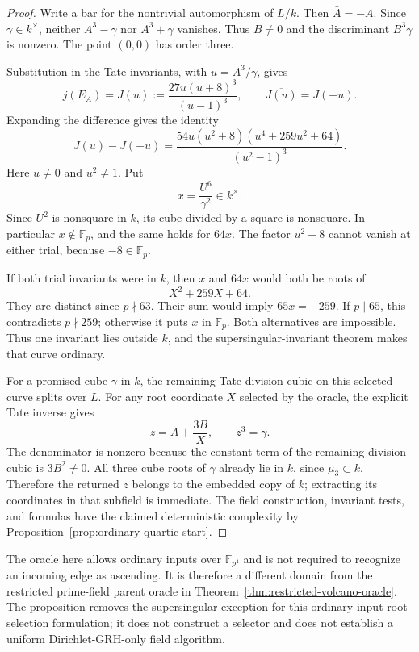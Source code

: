 \documentclass[11pt]{article}
\theoremstyle{definition}
\theoremstyle{remark}
\begin{document}
\begin{proof}
Write a bar for the nontrivial automorphism of $L/k$.
Then $\bar A=-A$.  Since $\gamma\in k^\times$, neither
$A^3-\gamma$ nor $A^3+\gamma$ vanishes.  Thus $B\ne0$ and
the discriminant $B^3\gamma$ is nonzero.  The point $(0,0)$
has order three.

Substitution in the Tate invariants, with $u=A^3/\gamma$,
gives
\[
 j(E_A)=J(u):=\frac{27u(u+8)^3}{(u-1)^3},
 \qquad \overline{J(u)}=J(-u).
\]
Expanding the difference gives the identity
\[
 J(u)-J(-u)
 =\frac{54u(u^2+8)(u^4+259u^2+64)}{(u^2-1)^3}.
\]
Here $u\ne0$ and $u^2\ne1$.  Put
\[
 x=\frac{U^6}{\gamma^2}\in k^\times.
\]
Since $U^2$ is nonsquare in $k$, its cube divided by a square
is nonsquare.  In particular $x\notin\mathbb F_p$, and the
same holds for $64x$.  The factor $u^2+8$ cannot vanish at
either trial, because $-8\in\mathbb F_p$.

If both trial invariants were in $k$, then $x$ and $64x$ would
both be roots of
\[
 X^2+259X+64.
\]
They are distinct since $p\nmid63$.  Their sum would imply
$65x=-259$.  If $p\mid65$, this contradicts $p\nmid259$;
otherwise it puts $x$ in $\mathbb F_p$.  Both alternatives
are impossible.  Thus one invariant lies outside $k$, and
the supersingular-invariant theorem makes that curve ordinary.

For a promised cube $\gamma$ in $k$, the remaining Tate
division cubic on this selected curve splits over $L$.
For any root coordinate $X$ selected by the oracle, the
explicit Tate inverse gives
\[
 z=A+\frac{3B}{X},\qquad z^3=\gamma.
\]
The denominator is nonzero because the constant term of the
remaining division cubic is $3B^2\ne0$.  All three cube
roots of $\gamma$ already lie in $k$, since $\mu_3\subset k$.
Therefore the returned $z$ belongs to the embedded copy of $k$;
extracting its coordinates in that subfield is immediate.
The field construction, invariant tests, and formulas have the
claimed deterministic complexity by
Proposition~\ref{prop:ordinary-quartic-start}.
\end{proof}

The oracle here allows ordinary inputs over $\mathbb F_{p^4}$
and is not required to recognize an incoming edge as ascending.
It is therefore a different domain from the restricted prime-field
parent oracle in Theorem~\ref{thm:restricted-volcano-oracle}.
The proposition removes the supersingular exception for this
ordinary-input root-selection formulation; it does not construct
a selector and does not establish a uniform Dirichlet-GRH-only
field algorithm.
\end{document}
